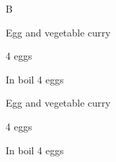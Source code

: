 \begin{menu}{B}
\begin{recipe}{2}{Egg and vegetable curry}
		\begin{ingredients}
		4  eggs  \\
	
		\end{ingredients}
	
    \begin{instructions}
    \item 
				In  boil
				4   eggs
    \end{instructions}
    \end{recipe}%
  
    \begin{recipe}{2}{Egg and vegetable curry}%
    
		\begin{ingredients}
		4  eggs  \\
	
		\end{ingredients}
	
    \begin{instructions}
    \item 
				In  boil
				4   eggs
    \end{instructions}
    \end{recipe}%
  
    \clearpage
    \end{menu}
	
	